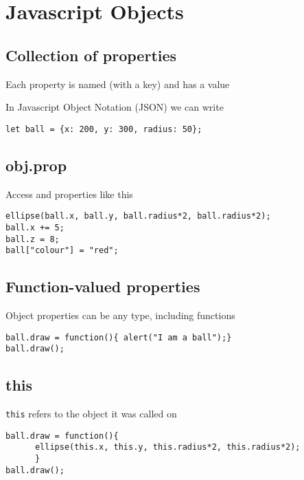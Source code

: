 \hypertarget{javascript-objects}{%
\section{Javascript Objects}\label{javascript-objects}}

\hypertarget{collection-of-properties}{%
\subsection{Collection of properties}\label{collection-of-properties}}

Each property is named (with a key) and has a value

In Javascript Object Notation (JSON) we can write

\begin{verbatim}
let ball = {x: 200, y: 300, radius: 50};
\end{verbatim}

\hypertarget{obj.prop}{%
\subsection{obj.prop}\label{obj.prop}}

Access and properties like this

\begin{verbatim}
ellipse(ball.x, ball.y, ball.radius*2, ball.radius*2);
ball.x += 5;
ball.z = 8;
ball["colour"] = "red";
\end{verbatim}

\hypertarget{function-valued-properties}{%
\subsection{Function-valued
properties}\label{function-valued-properties}}

Object properties can be any type, including functions

\begin{verbatim}
ball.draw = function(){ alert("I am a ball");}
ball.draw();
\end{verbatim}

\hypertarget{this}{%
\subsection{this}\label{this}}

\texttt{this} refers to the object it was called on

\begin{verbatim}
ball.draw = function(){
      ellipse(this.x, this.y, this.radius*2, this.radius*2);
      }
ball.draw();
\end{verbatim}

